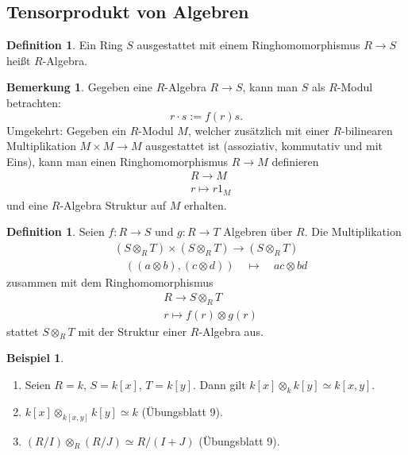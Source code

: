 \documentclass[reqno,12pt]{article}
\numberwithin{equation}{section}
\newcommand{\iso}{\simeq}
\theoremstyle{plain}
\theoremstyle{definition}
\newtheorem{definition}[thm]{Definition}
\newtheorem{example}[thm]{Beispiel}
\newtheorem{remark}[thm]{Bemerkung}
\begin{document}
\subsection{Tensorprodukt von Algebren}

\begin{definition}
Ein Ring $S$ ausgestattet mit einem Ringhomomorphismus $R \to S$ heißt {\sf $R$-Algebra}.
\end{definition}

\begin{remark}
Gegeben eine $R$-Algebra $R \to S$, kann man $S$ als $R$-Modul betrachten:
$$
r \cdot s := f(r)s.
$$
Umgekehrt: Gegeben ein $R$-Modul $M$, welcher zusätzlich mit einer $R$-bilinearen Multiplikation $M \times M \to M$ ausgestattet ist (assoziativ, kommutativ und mit Eins), kann man einen Ringhomomorphismus $R \to M$ definieren
\begin{align*}
& R \to M \\
& r \mapsto r1_M
\end{align*}
und eine $R$-Algebra Struktur auf $M$ erhalten.
\end{remark}

\begin{definition}
Seien $f \colon R \to S$ und $g \colon R \to T$ Algebren über $R$. Die Multiplikation
\begin{align*}
& (S \otimes_R T) \times (S \otimes_R T) \to (S \otimes_R T) \\
&  \quad  \left( (a \otimes b), (c \otimes d) \right) \quad \mapsto \quad ac \otimes bd
\end{align*}
zusammen mit dem Ringhomomorphismus
\begin{align*}
& R \to S \otimes_R T \\
& r \mapsto f(r) \otimes g(r)
\end{align*}
stattet $S \otimes_R T$ mit der Struktur einer $R$-Algebra aus.
\end{definition}

\begin{example}
\
\begin{enumerate}
\item Seien $R=k$, $S=k[x]$, $T=k[y]$. Dann gilt $k[x] \otimes_k k[y] \iso k[x,y]$.

\item $k[x] \otimes_{k[x,y]} k[y] \iso k$ (Übungsblatt 9).

\item $(R/I) \otimes_R (R/J) \iso R/(I+J)$ (Übungsblatt 9).
\end{enumerate}
\end{example}
\end{document}
